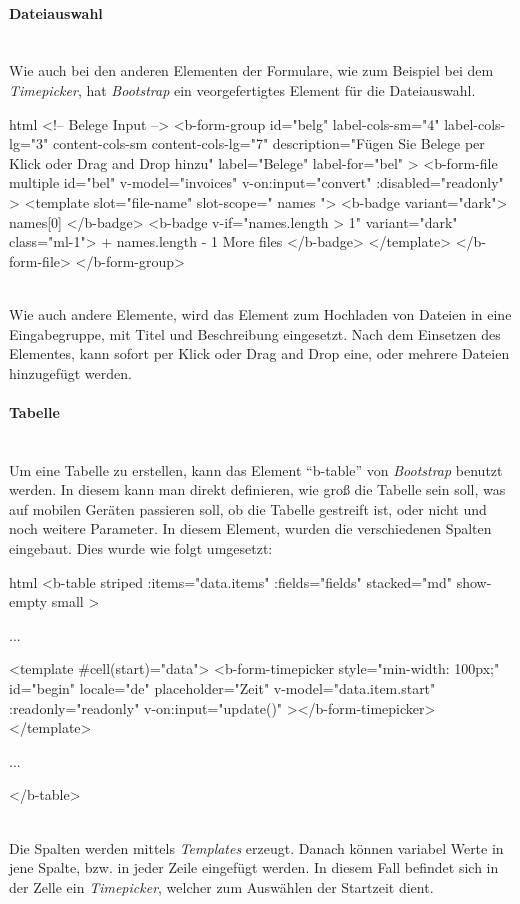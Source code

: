 \paragraph{Dateiauswahl}
~\\
Wie auch bei den anderen Elementen der Formulare, wie zum Beispiel bei dem \textit{Timepicker}, hat \textit{Bootstrap} ein veorgefertigtes Element für die Dateiauswahl. 
\begin{code}{html}
	<!-- Belege Input -->
	<b-form-group
	  id="belg"
	  label-cols-sm="4"
	  label-cols-lg="3"
	  content-cols-sm
	  content-cols-lg="7"
	  description="Fügen Sie Belege per Klick oder Drag and Drop hinzu"
	  label="Belege"
	  label-for="bel"
	>
	  <b-form-file
		multiple
		id="bel"
		v-model="invoices"
		v-on:input="convert"
		:disabled="readonly"
	  >
		<template slot="file-name" slot-scope="{ names }">
		  <b-badge variant="dark">{{ names[0] }}</b-badge>
		  <b-badge v-if="names.length > 1" variant="dark" class="ml-1">
			+ {{ names.length - 1 }} More files
		  </b-badge>
		</template>
	  </b-form-file>
	</b-form-group>
\end{code}
	\label{list:dateiselect} ~\\
Wie auch andere Elemente, wird das Element zum Hochladen von Dateien in eine Eingabegruppe, mit Titel und Beschreibung eingesetzt. Nach dem Einsetzen des Elementes, kann sofort per Klick oder Drag and Drop eine, oder mehrere Dateien hinzugefügt werden.
\paragraph{Tabelle}
~\\
Um eine Tabelle zu erstellen, kann das Element \enquote{b-table} von \textit{Bootstrap} benutzt werden. In diesem kann man direkt definieren, wie groß die Tabelle sein soll, was auf mobilen Geräten passieren soll, ob die Tabelle gestreift ist, oder nicht und noch weitere Parameter. In diesem Element, wurden die verschiedenen Spalten eingebaut. Dies wurde wie folgt umgesetzt:
\begin{code}{html}
	<b-table
          striped
          :items="data.items"
          :fields="fields"
          stacked="md"
          show-empty
          small
    >

		...

		<template #cell(start)="data">
			<b-form-timepicker
				style="min-width: 100px;"
				id="begin"
				locale="de"
				placeholder="Zeit"
				v-model="data.item.start"
				:readonly="readonly"
				v-on:input="update()"
			></b-form-timepicker>
		</template>

		...

	</b-table>
\end{code}
	\label{list:bsptable} ~\\
Die Spalten werden mittels \textit{Templates} erzeugt. Danach können variabel Werte in jene Spalte, bzw. in jeder Zeile eingefügt werden. In diesem Fall befindet sich in der Zelle ein \textit{Timepicker}, welcher zum Auswählen der Startzeit dient.
\newpage
